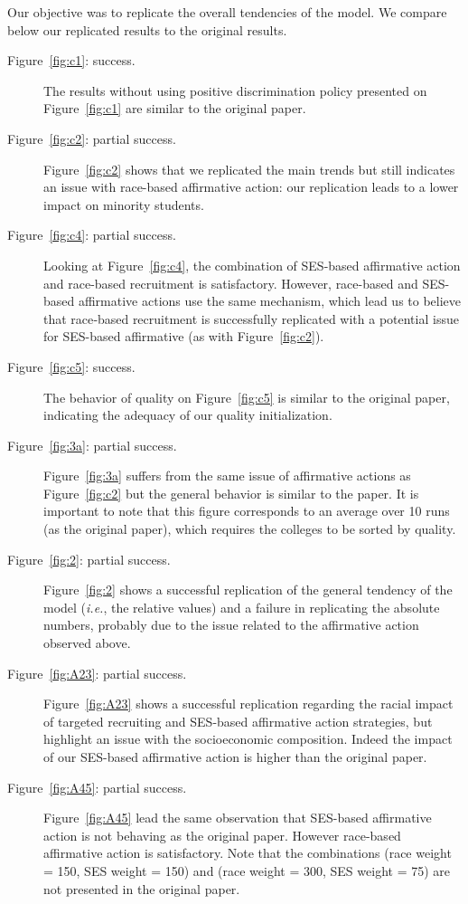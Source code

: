 Our objective was to replicate the overall tendencies of the model. 
We compare below our replicated results to the original results.

\begin{description}

\item[Figure~\ref{fig:c1}: success.] The results without using positive discrimination policy presented on Figure~\ref{fig:c1} are similar to the original paper.

\item[Figure~\ref{fig:c2}: partial success.] Figure~\ref{fig:c2} shows that we replicated the main trends but still indicates an issue with race-based affirmative action: our replication leads to a lower impact on minority students.

\item [Figure~\ref{fig:c4}: partial success.] Looking at Figure~\ref{fig:c4}, the combination of SES-based affirmative action and race-based recruitment is satisfactory. 
However, race-based and SES-based affirmative actions use the same mechanism, which lead us to believe that race‐based recruitment is successfully replicated with a potential issue for SES-based affirmative (as with Figure~\ref{fig:c2}).

\item [Figure~\ref{fig:c5}: success.]  The behavior of quality on Figure~\ref{fig:c5} is similar to the original paper, indicating the adequacy of our quality initialization.

\item[Figure~\ref{fig:3a}: partial success.]  Figure~\ref{fig:3a} suffers from the same issue of affirmative actions as Figure~\ref{fig:c2} but the general behavior is similar to the paper. 
It is important to note that this figure corresponds to an average over 10 runs (as the original paper), which requires the colleges to be sorted by quality.

\item[Figure~\ref{fig:2}: partial success.]  Figure~\ref{fig:2} shows a successful replication of the general tendency of the model (\emph{i.e.}, the relative values) and a failure in replicating the absolute numbers, probably due to the issue related to the affirmative action observed above.

\item[Figure~\ref{fig:A23}: partial success.] Figure~\ref{fig:A23} shows a successful replication regarding the racial impact of targeted recruiting and SES-based affirmative action strategies, but highlight an issue with the socioeconomic composition. Indeed the impact of our SES-based affirmative action is higher than the original paper.

\item[Figure~\ref{fig:A45}: partial success.] Figure~\ref{fig:A45} lead the same observation that SES-based affirmative action is not behaving as the original paper. However race-based affirmative action is satisfactory. Note that the combinations (race weight = 150, SES weight = 150) and (race weight = 300, SES weight = 75) are not presented in the original paper.

\end{description}

